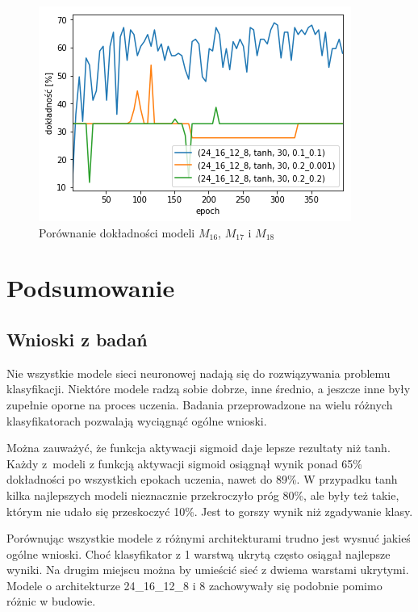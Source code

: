     \begin{figure}[htp]
        \centering
        \includegraphics[scale=0.8]{./img/lr-accuracy-tanh.png}
        \caption{Porównanie dokładności modeli $M_{16}$, $M_{17}$ i $M_{18}$}
    \end{figure}

    \chapter{Podsumowanie}\label{ch:podsumowanie}

    \section{Wnioski z badań}\label{sec:wnioskiZBadań}

    Nie wszystkie modele sieci neuronowej nadają się do rozwiązywania problemu klasyfikacji.
    Niektóre modele radzą sobie dobrze, inne średnio, a jeszcze inne były zupełnie oporne na proces uczenia.
    Badania przeprowadzone na wielu różnych klasyfikatorach pozwalają wyciągnąć ogólne wnioski.

    Można zauważyć, że funkcja aktywacji sigmoid daje lepsze rezultaty niż tanh.
    Każdy z~modeli z funkcją aktywacji sigmoid osiągnął wynik ponad 65\% dokładności po wszystkich epokach uczenia, nawet do 89\%.
    W przypadku tanh kilka najlepszych modeli nieznacznie przekroczyło próg 80\%, ale były też takie, którym nie udało się przeskoczyć 10\%.
    Jest to gorszy wynik niż zgadywanie klasy.

    Porównując wszystkie modele z różnymi architekturami trudno jest wysnuć jakieś ogólne wnioski.
    Choć klasyfikator z 1 warstwą ukrytą często osiągał najlepsze wyniki.
    Na drugim miejscu można by umieścić sieć z dwiema warstami ukrytymi.
    Modele o architekturze 24\_16\_12\_8 i 8 zachowywały się podobnie pomimo różnic w budowie.

